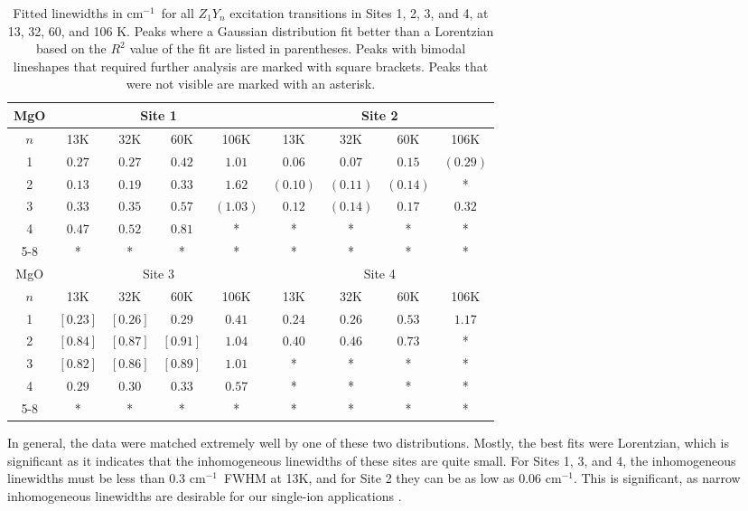 \documentclass[12pt]{puthesis}
\newcommand{\wn}{cm$^{-1}$}
\begin{document}
\begin{table}[t]
  \centering
  \begin{tabular}{|c| c| c | c | c | c | c | c | c|}
    \hline
    MgO & \multicolumn{4}{c|}{Site 1} & \multicolumn{4}{c|}{Site 2} \\
    \hline
    $n$ & 13K & 32K & 60K & 106K & 13K & 32K & 60K & 106K \\
    \hline
    1 & $0.27$ & $0.27$ & $0.42$ & $1.01$   & $0.06$   & $0.07$   & $0.15$   & $(0.29)$ \\
    2 & $0.13$ & $0.19$ & $0.33$ & $1.62$   & $(0.10)$ & $(0.11)$ & $(0.14)$ & *      \\
    3 & $0.33$ & $0.35$ & $0.57$ & $(1.03)$ & $0.12$   & $(0.14)$ & $0.17$   & $0.32$ \\
    4 & $0.47$ & $0.52$ & $0.81$ & *        & *        & *        & *        & *      \\
    5-8 & * & * & * & * & * & * & * & * \\
    \hline \hline
    MgO & \multicolumn{4}{c|}{Site 3} & \multicolumn{4}{c|}{Site 4} \\
    \hline
    $n$ & 13K & 32K & 60K & 106K & 13K & 32K & 60K & 106K \\
    \hline
    1 & $[0.23]$ & $[0.26]$ & $0.29$ & $0.41$ & $0.24$ & $0.26$ & $0.53$ & $1.17$ \\
    2 & $[0.84]$ & $[0.87]$ & $[0.91]$ & $1.04$ & $0.40$ & $0.46$ & $0.73$ & *      \\
    3 & $[0.82]$ & $[0.86]$ & $[0.89]$ & $1.01$ & *      & *      & *      & *      \\
    4 & $0.29$ & $0.30$ & $0.33$ & $0.57$ & *      & *      & *      & *      \\
    5-8 & * & * & * & * & * & * & * & * \\
    \hline
  \end{tabular}
  \caption{Fitted linewidths in \wn\ for all $Z_{1}Y_{n}$ excitation transitions in Sites 1, 2, 3, and 4, at 13, 32, 60, and 106 K. Peaks where a Gaussian distribution fit better than a Lorentzian based on the $R^{2}$ value of the fit are listed in parentheses. Peaks with bimodal lineshapes that required further analysis are marked with square brackets. Peaks that were not visible are marked with an asterisk.}
  \label{tab:mgolinewidths}
\end{table}

In general, the data were matched extremely well by one of these two distributions. Mostly, the best fits were Lorentzian, which is significant as it indicates that the inhomogeneous linewidths of these sites are quite small. For Sites 1, 3, and 4, the inhomogeneous linewidths must be less than 0.3 \wn\ FWHM at 13K, and for Site 2 they can be as low as 0.06 \wn. This is significant, as narrow inhomogeneous linewidths are desirable for our single-ion applications \cite{Dibos2017}.
\end{document}
